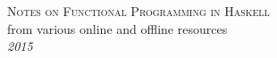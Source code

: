 \documentclass{scrbook}
\begin{document}
\frontmatter
\begin{titlepage}
\raggedleft
{\Huge\scshape Notes on Functional Programming in Haskell\\[.2in]}
{\large from various online and offline resources\\[1in]}
\vfill
{\itshape 2015}
\end{titlepage}
\tableofcontents
\mainmatter

\appendix

\backmatter
\nocite{*}
%
    

\end{document}
